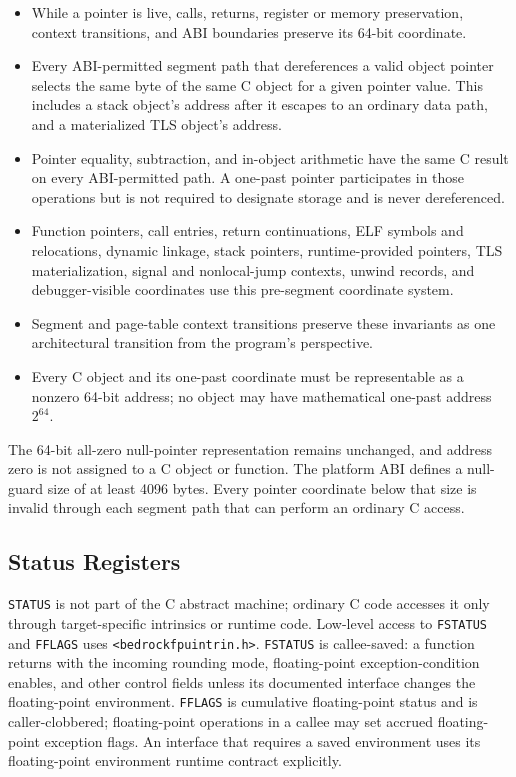 \documentclass[10pt,twoside]{article}
\begin{document}
\begin{itemize}
\item While a pointer is live, calls, returns, register or memory preservation,
context transitions, and ABI boundaries preserve its 64-bit coordinate.
\item Every ABI-permitted segment path that dereferences a valid object
pointer selects the same byte of the same C object for a given pointer value.
This includes a stack object's address after it escapes to an ordinary data
path, and a materialized TLS object's address.
\item Pointer equality, subtraction, and in-object arithmetic have the same C
result on every ABI-permitted path. A one-past pointer participates in those
operations but is not required to designate storage and is never dereferenced.
\item Function pointers, call entries, return continuations, ELF symbols and
relocations, dynamic linkage, stack pointers, runtime-provided pointers, TLS
materialization, signal and nonlocal-jump contexts, unwind records, and
debugger-visible coordinates use this pre-segment coordinate system.
\item Segment and page-table context transitions preserve these invariants as
one architectural transition from the program's perspective.
\item Every C object and its one-past coordinate must be representable as a
nonzero 64-bit address; no object may have mathematical one-past address
$2^{64}$.
\end{itemize}

The 64-bit all-zero null-pointer representation remains unchanged, and address
zero is not assigned to a C object or function. The platform ABI defines a
null-guard size of at least 4096 bytes. Every pointer coordinate below that
size is invalid through each segment path that can perform an ordinary C
access.

\subsection{Status Registers}
\texttt{STATUS} is not part of the C abstract machine; ordinary C code accesses
it only through target-specific intrinsics or runtime code. Low-level access to
\texttt{FSTATUS} and \texttt{FFLAGS} uses
\texttt{<bedrockfpuintrin.h>}. \texttt{FSTATUS} is callee-saved: a function
returns with the incoming rounding mode, floating-point exception-condition enables, and other control fields
unless its documented interface changes the floating-point environment.
\texttt{FFLAGS} is cumulative floating-point status and is caller-clobbered;
floating-point operations in a callee may set accrued floating-point exception flags. An
interface that requires a saved environment uses its floating-point environment
runtime contract explicitly.
\end{document}
